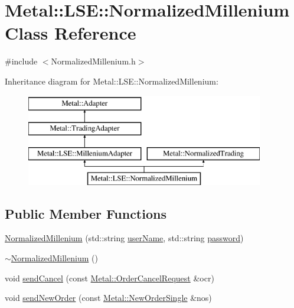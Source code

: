 \hypertarget{classMetal_1_1LSE_1_1NormalizedMillenium}{}\section{Metal\+:\+:L\+S\+E\+:\+:Normalized\+Millenium Class Reference}
\label{classMetal_1_1LSE_1_1NormalizedMillenium}


{\ttfamily \#include $<$Normalized\+Millenium.\+h$>$}

Inheritance diagram for Metal\+:\+:L\+S\+E\+:\+:Normalized\+Millenium\+:\begin{figure}[H]
\begin{center}
\leavevmode
\includegraphics[height=4.000000cm]{classMetal_1_1LSE_1_1NormalizedMillenium}
\end{center}
\end{figure}
\subsection*{Public Member Functions}
\begin{DoxyCompactItemize}
\item 
\hyperlink{classMetal_1_1LSE_1_1NormalizedMillenium_a5716062f452358e985155bbbc2736fdd}{Normalized\+Millenium} (std\+::string \hyperlink{classMetal_1_1LSE_1_1MilleniumAdapter_a1c12122da30ec79f3907a82ac1847c33}{user\+Name}, std\+::string \hyperlink{classMetal_1_1LSE_1_1MilleniumAdapter_aa8120f11aac5d4825a5766d86e53e5a2}{password})
\item 
\hyperlink{classMetal_1_1LSE_1_1NormalizedMillenium_a7c5268eb2ce51a54066460651814ce64}{$\sim$\+Normalized\+Millenium} ()
\item 
void \hyperlink{classMetal_1_1LSE_1_1NormalizedMillenium_a0307ee675723035de1c9a83de1e54ead}{send\+Cancel} (const \hyperlink{classMetal_1_1OrderCancelRequest}{Metal\+::\+Order\+Cancel\+Request} \&ocr)
\item 
void \hyperlink{classMetal_1_1LSE_1_1NormalizedMillenium_a0779d0218ce1dd1b9f0381dbd16ee142}{send\+New\+Order} (const \hyperlink{classMetal_1_1NewOrderSingle}{Metal\+::\+New\+Order\+Single} \&nos)
\end{DoxyCompactItemize}
